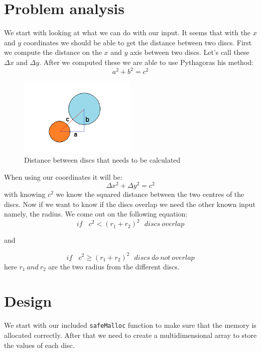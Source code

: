 \documentclass[a4paper,10pt]{article}
\begin{document}
\section{Problem analysis}
We start with looking at what we can do with our input. It seems that with the $x$ and $y$ coordinates we should be able to get the distance between two discs. First we compute the distance on the $x$ and $y$ axis between two discs. Let's call these $\Delta x$ and $\Delta y$. After we computed these we are able to use Pythagoras his method:
\begin{equation}
a^2 + b^2 =  c^2
\end{equation}
\begin{figure}[h]
\caption{Distance between discs that needs to be calculated}
\centering
\includegraphics[width=0.5\textwidth]{img3.png}
\end{figure}
When using our coordinates it will be:
\begin{equation}
\Delta x^2 + \Delta y^2 = c^2
\end{equation}
with knowing $c^2$ we know the squared distance between the two centres of the discs. Now if we want to know if the discs overlap we need the other known input namely, the radius. We come out on the following equation:
\begin{equation}
if\:\:\:\ c^2 < (r_{1} + r_{2})^2\:\:\:discs\: overlap
\end{equation}
\begin{center}
\begin{minipage}{.6\textwidth}
\centering
and
\end{minipage}
\end{center} 
\begin{equation}
if\:\:\:\ c^2 \geq (r_{1} + r_{2})^2\:\:\:discs\: do\:not\:overlap
\end{equation}   
here $r_{1} \: and \: r_{2}$ are the two radius from the different discs.


\section{Design}
We start with our included {\tt safeMalloc} function to make sure that the memory is allocated correctly. After that we need to create a multidimensional array to store the values of each disc. 
\end{document}
